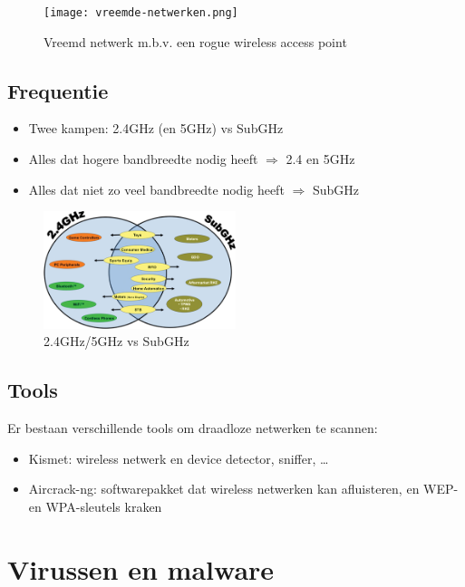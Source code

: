 \documentclass{article}
\begin{document}
\begin{figure}[H]
    \centering
    \texttt{[image: vreemde-netwerken.png]}
    \caption{Vreemd netwerk m.b.v. een rogue wireless access point}
\end{figure}

\subsection{Frequentie}

\begin{itemize}
    \item Twee kampen: 2.4GHz (en 5GHz) vs SubGHz
    \item Alles dat hogere bandbreedte nodig heeft $\Rightarrow$ 2.4 en 5GHz
    \item Alles dat niet zo veel bandbreedte nodig heeft $\Rightarrow$ SubGHz
\end{itemize}


\begin{figure}[H]
    \centering
    \includegraphics[width=0.5\textwidth]{2.4-subghz.png}
    \caption{2.4GHz/5GHz vs SubGHz}
\end{figure}

\subsection{Tools}

Er bestaan verschillende tools om draadloze netwerken te scannen:

\begin{itemize}
    \item Kismet: wireless netwerk en device detector, sniffer, \dots
    \item Aircrack-ng: softwarepakket dat wireless netwerken kan afluisteren, en WEP- en WPA-sleutels kraken
\end{itemize}

\section{Virussen en malware}
\end{document}
